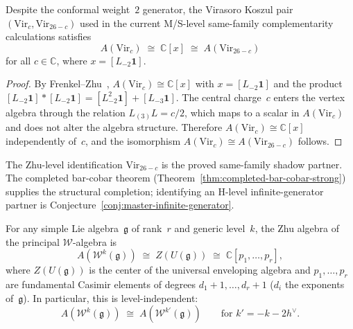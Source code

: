 \begin{corollary}
\label{cor:virasoro-zhu-koszul}
Despite the conformal weight~$2$ generator, the Virasoro Koszul pair
$(\mathrm{Vir}_c, \mathrm{Vir}_{26-c})$ used in the current M/S-level
same-family complementarity calculations satisfies
\[
A(\mathrm{Vir}_c) \;\cong\; \mathbb{C}[x]
\;\cong\; A(\mathrm{Vir}_{26-c})
\]
for all $c \in \mathbb{C}$, where $x = [L_{-2}\mathbf{1}]$.
\end{corollary}

\begin{proof}
By Frenkel--Zhu~\cite{FZ92},
$A(\mathrm{Vir}_c) \cong \mathbb{C}[x]$ with
$x = [L_{-2}\mathbf{1}]$ and the product
$[L_{-2}\mathbf{1}] * [L_{-2}\mathbf{1}]
= [L_{-2}^2\mathbf{1}] + [L_{-3}\mathbf{1}]$.
The central charge~$c$ enters the vertex algebra through the
relation $L_{(3)}L = c/2$, which maps to a scalar in
$A(\mathrm{Vir}_c)$ and does not alter the algebra structure.
Therefore $A(\mathrm{Vir}_c) \cong \mathbb{C}[x]$
independently of~$c$, and the isomorphism
$A(\mathrm{Vir}_c) \cong A(\mathrm{Vir}_{26-c})$ follows.
\end{proof}

\begin{remark}\label{rem:virasoro-mc4-scope}
The Zhu-level identification $\mathrm{Vir}_{26-c}$ is the proved
same-family shadow partner. The completed bar-cobar theorem
\textup{(}Theorem~\textup{\ref{thm:completed-bar-cobar-strong}}\textup{)}
supplies the structural completion; identifying an H-level
infinite-generator partner is Conjecture~\ref{conj:master-infinite-generator}.
\end{remark}

\begin{theorem}
\label{thm:w-algebra-zhu-koszul}
For any simple Lie algebra~$\mathfrak{g}$ of rank~$r$ and generic level~$k$,
the Zhu algebra of the principal $\mathcal{W}$-algebra is
\begin{equation}\label{eq:w-zhu-center}
A(\mathcal{W}^k(\mathfrak{g}))
 \;\cong\; Z(U(\mathfrak{g}))
 \;\cong\; \mathbb{C}[p_1, \ldots, p_r],
\end{equation}
where $Z(U(\mathfrak{g}))$ is the center of the universal enveloping
algebra and $p_1, \ldots, p_r$ are fundamental Casimir elements of
degrees $d_1 + 1, \ldots, d_r + 1$ \textup{(}$d_i$ the exponents
of~$\mathfrak{g}$\textup{)}. In particular, this is level-independent:
\[
A(\mathcal{W}^k(\mathfrak{g}))
 \;\cong\; A(\mathcal{W}^{k'}(\mathfrak{g}))
 \qquad \text{for } k' = -k - 2h^\vee.
\]
\end{theorem}

